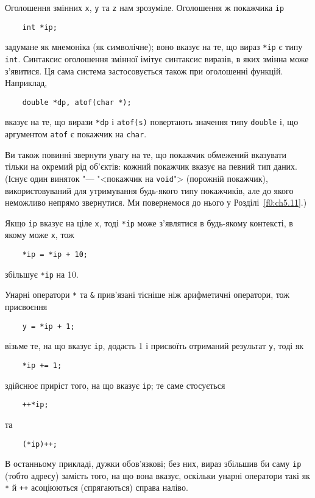 \documentclass[a4paper,12pt]{book}
\begin{document}
  Оголошення змінних \texttt{x}, \texttt{y} та \texttt{z} нам зрозуміле. Оголошення ж
  покажчика \texttt{ip}
  \begin{verbatim}
    int *ip;
  \end{verbatim}
  задумане як мнемоніка (як символічне); воно вказує на те, що вираз \texttt{*ip} є типу
  \texttt{int}. Синтаксис оголошення змінної імітує синтаксис виразів, в яких змінна може
  з'явитися. Ця сама система застосовується також при оголошенні функцій. Наприклад,
  \begin{verbatim}
    double *dp, atof(char *);
  \end{verbatim}
  вказує на те, що вирази \texttt{*dp} і \texttt{atof(s)} повертають значення типу
  \texttt{double} і, що аргументом \texttt{atof} є покажчик на \texttt{char}.

  Ви також повинні звернути увагу на те, що покажчик обмежений вказувати тільки на окремий
  рід об'єктів: кожний покажчик вказує на певний тип даних. (Існує один виняток "---
  "<покажчик на \texttt{void}"> (порожній покажчик), використовуваний для
  утримування будь-якого типу покажчиків, але до якого неможливо непрямо звернутися. Ми
  повернемося до нього у Розділі~\ref{f0:ch5.11}.)

  Якщо \texttt{ip} вказує на ціле \texttt{x}, тоді \texttt{*ip} може з'являтися в
  будь-якому контексті, в якому може \texttt{x}, тож
  \begin{verbatim}
    *ip = *ip + 10;
  \end{verbatim}
  збільшує \texttt{*ip} на 10.

  Унарні оператори
  \texttt{*} та
  \texttt{\&} прив'язані тісніше ніж арифметичні оператори, тож присвоєння
  \begin{verbatim}
    y = *ip + 1;
  \end{verbatim}
  візьме те, на що вказує \texttt{ip}, додасть 1 і присвоїть отриманий результат
  \texttt{y}, тоді як
  \begin{verbatim}
    *ip += 1;
  \end{verbatim}
  здійснює приріст того, на що вказує \texttt{ip}; те саме стосується
  \begin{verbatim}
    ++*ip;
  \end{verbatim}
  та
  \begin{verbatim}
    (*ip)++;
  \end{verbatim}

  В останньому прикладі, дужки обов'язкові; без них, вираз збільшив би саму \texttt{ip}
  (тобто адресу) замість того, на що вона вказує, оскільки унарні оператори такі як
  \texttt{*} й \texttt{++} асоціюються (спрягаються) справа наліво.
\end{document}
